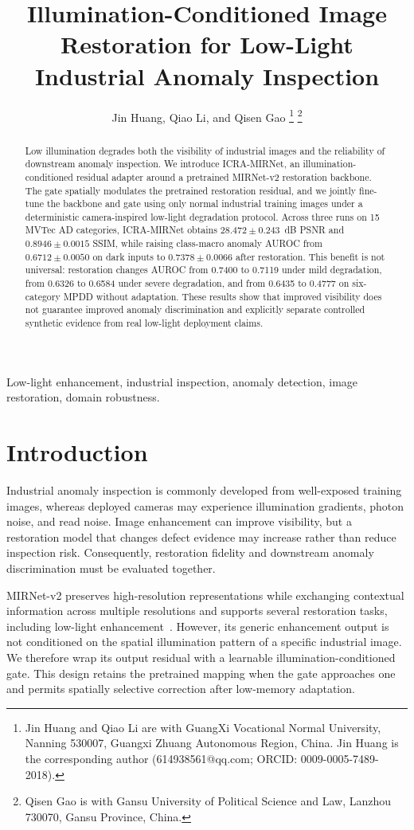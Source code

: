 \documentclass[10pt,journal]{IEEEtran}
\title{Illumination-Conditioned Image Restoration for Low-Light Industrial Anomaly Inspection}
\author{Jin Huang, Qiao Li, and Qisen Gao
\thanks{Jin Huang and Qiao Li are with GuangXi Vocational Normal University, Nanning 530007, Guangxi Zhuang Autonomous Region, China. Jin Huang is the corresponding author (614938561@qq.com; ORCID: 0009-0005-7489-2018).}
\thanks{Qisen Gao is with Gansu University of Political Science and Law, Lanzhou 730070, Gansu Province, China.}}
\begin{document}
\maketitle

\begin{abstract}
Low illumination degrades both the visibility of industrial images and the reliability of downstream anomaly inspection. We introduce ICRA-MIRNet, an illumination-conditioned residual adapter around a pretrained MIRNet-v2 restoration backbone. The gate spatially modulates the pretrained restoration residual, and we jointly fine-tune the backbone and gate using only normal industrial training images under a deterministic camera-inspired low-light degradation protocol. Across three runs on 15 MVTec AD categories, ICRA-MIRNet obtains $28.472\pm0.243$~dB PSNR and $0.8946\pm0.0015$ SSIM, while raising class-macro anomaly AUROC from $0.6712\pm0.0050$ on dark inputs to $0.7378\pm0.0066$ after restoration. This benefit is not universal: restoration changes AUROC from 0.7400 to 0.7119 under mild degradation, from 0.6326 to 0.6584 under severe degradation, and from 0.6435 to 0.4777 on six-category MPDD without adaptation. These results show that improved visibility does not guarantee improved anomaly discrimination and explicitly separate controlled synthetic evidence from real low-light deployment claims.
\end{abstract}

\begin{IEEEkeywords}
Low-light enhancement, industrial inspection, anomaly detection, image restoration, domain robustness.
\end{IEEEkeywords}

\section{Introduction}
Industrial anomaly inspection is commonly developed from well-exposed training images, whereas deployed cameras may experience illumination gradients, photon noise, and read noise. Image enhancement can improve visibility, but a restoration model that changes defect evidence may increase rather than reduce inspection risk. Consequently, restoration fidelity and downstream anomaly discrimination must be evaluated together.

MIRNet-v2 preserves high-resolution representations while exchanging contextual information across multiple resolutions and supports several restoration tasks, including low-light enhancement~\cite{zamir2023mirnetv2}. However, its generic enhancement output is not conditioned on the spatial illumination pattern of a specific industrial image. We therefore wrap its output residual with a learnable illumination-conditioned gate. This design retains the pretrained mapping when the gate approaches one and permits spatially selective correction after low-memory adaptation.
\end{document}
